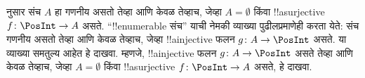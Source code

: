 \documentclass[../../../include/open-logic-section]{subfiles}
\begin{document}
\begin{prob}
   नुसार संच $A$ हा गणनीय
  असतो तेव्हा आणि केवळ तेव्हाच, जेव्हा $A = \emptyset$ किंवा
  !!a{surjective} $f\colon \PosInt \to A$ असते.
  ``!!{enumerable} संच'' याची नेमकी व्याख्या पुढीलप्रमाणेही करता येते:
  संच गणनीय असतो तेव्हा आणि केवळ तेव्हाच, जेव्हा !!a{injective}
  फलन $g\colon A \to \PosInt$ असते. या व्याख्या समतुल्य आहेत
  हे दाखवा. म्हणजे, !!a{injective} फलन $g\colon A \to \PosInt$
  असते तेव्हा आणि केवळ तेव्हाच, जेव्हा $A = \emptyset$ किंवा
  !!a{surjective} $f\colon \PosInt \to A$ असते, हे दाखवा.
\end{prob}
\end{document}

